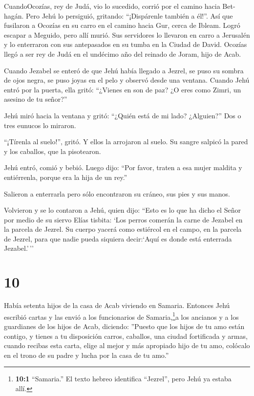  CuandoOcozías, rey de Judá, vio lo sucedido, corrió por el
camino hacia Bet-hagán. Pero Jehú lo persiguió, gritando: ``¡Dispárenle
también a él!''. Así que fusilaron a Ocozías en su carro en el camino
hacia Gur, cerca de Ibleam. Logró escapar a Meguido, pero allí murió.
 Sus servidores lo llevaron en carro a Jerusalén y lo
enterraron con sus antepasados en su tumba en la Ciudad de David.
 Ocozías llegó a ser rey de Judá en el undécimo año del
reinado de Joram, hijo de Acab.

 Cuando Jezabel se enteró de que Jehú había llegado a
Jezrel, se puso su sombra de ojos negra, se puso joyas en el pelo y
observó desde una ventana.  Cuando Jehú entró por la
puerta, ella gritó: ``¿Vienes en son de paz? ¿O eres como Zimri, un
asesino de tu señor?''

 Jehú miró hacia la ventana y gritó: ``¿Quién está de mi
lado? ¿Alguien?'' Dos o tres eunucos lo miraron.

 ``¡Tírenla al suelo!'', gritó. Y ellos la arrojaron al
suelo. Su sangre salpicó la pared y los caballos, que la pisotearon.

 Jehú entró, comió y bebió. Luego dijo: ``Por favor, traten
a esa mujer maldita y entiérrenla, porque era la hija de un rey.''

 Salieron a enterrarla pero sólo encontraron su cráneo, sus
pies y sus manos.

 Volvieron y se lo contaron a Jehú, quien dijo: ``Esto es
lo que ha dicho el Señor por medio de su siervo Elías tisbita: `Los
perros comerán la carne de Jezabel en la parcela de Jezrel.
 Su cuerpo yacerá como estiércol en el campo, en la parcela
de Jezrel, para que nadie pueda siquiera decir:`Aquí es donde está
enterrada Jezabel.'\,''

\hypertarget{section-9}{%
\section{10}\label{section-9}}

 Había setenta hijos de la casa de Acab viviendo en Samaria.
Entonces Jehú escribió cartas y las envió a los funcionarios de
Samaria,\footnote{\textbf{10:1} ``Samaria.'' El texto hebreo identifica
  ``Jezrel'', pero Jehú ya estaba allí.}a los ancianos y a los
guardianes de los hijos de Acab, diciendo:  ''Puesto que los
hijos de tu amo están contigo, y tienes a tu disposición carros,
caballos, una ciudad fortificada y armas, cuando recibas esta carta,
 elige al mejor y más apropiado hijo de tu amo, colócalo en
el trono de su padre y lucha por la casa de tu amo.''

